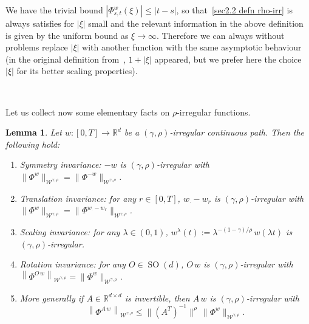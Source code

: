 \documentclass[10pt]{article}
\newcommand{\assign}{:=}
\newcommand{\comma}{{,}}
\newcommand{\tmop}[1]{\ensuremath{\operatorname{#1}}}
\newtheorem{lemma}[theorem]{Lemma}
\begin{document}
We have the trivial bound $| \Phi^w_{s, t} (\xi) | \leqslant | t - s |$, so
that~\eqref{sec2.2 defn rho-irr} is always satisfies for $| \xi |$ small and
the relevant information in the above definition is given by the uniform bound
as $\xi \rightarrow \infty$. Therefore we can always without problems replace
$| \xi |$ with another function with the same asymptotic behaviour (in the
original definition from~{\cite{catelliergubinelli}}, $1 + | \xi |$ appeared,
but we prefer here the choice $| \xi |$ for its better scaling properties).

\

Let us collect now some elementary facts on $\rho$\mbox{-}irregular
functions.

\begin{lemma}
  \label{sec2.2 lemma properties rho irr}Let $w : [0, T] \rightarrow
  \mathbb{R}^d$ be a $(\gamma, \rho)$\mbox{-}irregular continuous path. Then
  the following hold:
  \begin{enumerate}[label=\roman*.]
    \item Symmetry invariance: $- w$ is $(\gamma, \rho)$\mbox{-}irregular with
    $\| \Phi^w \|_{\mathcal{W}^{\gamma, \rho}} = \| \Phi^{- w}
    \|_{\mathcal{W}^{\gamma, \rho}}$.    
    \item Translation invariance: for any $r \in [0, T]$, $w_{\cdot} - w_r$ is
    $(\gamma, \rho)$\mbox{-}irregular with $\| \Phi^w \|_{\mathcal{W}^{\gamma,
    \rho}} = \| \Phi^{w_{\cdot} - w_r} \|_{\mathcal{W}^{\gamma, \rho}}$. 
    \item Scaling invariance: for any $\lambda \in (0, 1)$, $w^{\lambda} (t)
    \assign \lambda^{- (1 - \gamma) / \rho} \, w (\lambda t)$ is $(\gamma,
    \rho)$\mbox{-}irregular.
    \item Rotation invariance: for any $O \in \tmop{SO} (d)$, $O \, w$ is
    $(\gamma, \rho)$-irregular with $\left\| \Phi^{O \, w}
    \right\|_{\mathcal{W}^{\gamma \comma \rho}} = \| \Phi^w
    \|_{\mathcal{W}^{\gamma \comma \rho}}$.
    \item More generally if $A \in \mathbb{R}^{d \times d}$ is invertible,
    then $A \, w$ is $(\gamma, \rho)$-irregular with
    \[ \left\| \Phi^{A \, w} \right\|_{\mathcal{W}^{\gamma \comma \rho}}
       \leqslant \| (A^T)^{- 1} \|^{\rho} \, \| \Phi^w \|_{\mathcal{W}^{\gamma
       \comma \rho}} . \]
  \end{enumerate}
\end{lemma}
\end{document}
